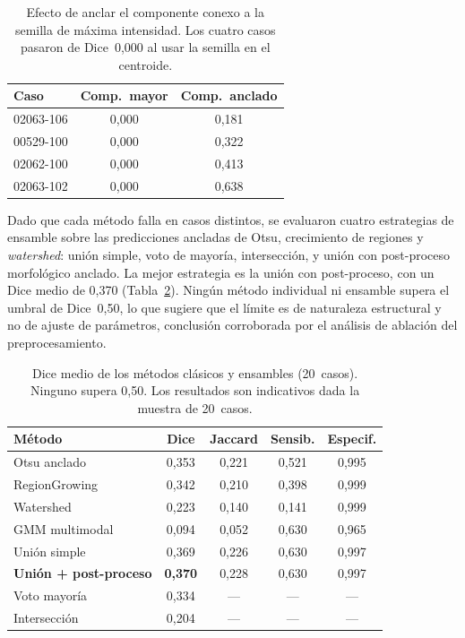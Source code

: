 \documentclass[conference]{IEEEtran}
\begin{document}
\begin{table}[h]
\centering\small
\caption{Efecto de anclar el componente conexo a la semilla de
m\'{a}xima intensidad. Los cuatro casos pasaron de Dice~0,000 al
usar la semilla en el centroide.}
\label{tab:rescate}
\begin{tabular}{lcc}
\toprule
Caso & Comp.\ mayor & Comp.\ anclado \\
\midrule
02063-106 & 0,000 & 0,181 \\
00529-100 & 0,000 & 0,322 \\
02062-100 & 0,000 & 0,413 \\
02063-102 & 0,000 & 0,638 \\
\bottomrule
\end{tabular}
\end{table}

Dado que cada m\'{e}todo falla en casos distintos, se evaluaron
cuatro estrategias de ensamble sobre las predicciones ancladas
de Otsu, crecimiento de regiones y \textit{watershed}: uni\'{o}n
simple, voto de mayor\'{i}a, intersecci\'{o}n, y uni\'{o}n con
post-proceso morfol\'{o}gico anclado.
La mejor estrategia es la uni\'{o}n con post-proceso, con un Dice
medio de 0,370 (Tabla~\ref{tab:clasicos}).
Ning\'{u}n m\'{e}todo individual ni ensamble supera el umbral de
Dice~0,50, lo que sugiere que el l\'{i}mite es de naturaleza
estructural y no de ajuste de par\'{a}metros, conclusi\'{o}n
corroborada por el an\'{a}lisis de ablaci\'{o}n del
preprocesamiento.

\begin{table}[h]
\centering\small
\caption{Dice medio de los m\'{e}todos cl\'{a}sicos y ensambles
(20~casos). Ninguno supera 0,50. Los resultados son indicativos
dada la muestra de 20~casos.}
\label{tab:clasicos}
\begin{tabular}{lcccc}
\toprule
M\'{e}todo & Dice & Jaccard & Sensib. & Especif. \\
\midrule
Otsu anclado & 0,353 & 0,221 & 0,521 & 0,995 \\
RegionGrowing & 0,342 & 0,210 & 0,398 & 0,999 \\
Watershed & 0,223 & 0,140 & 0,141 & 0,999 \\
GMM multimodal & 0,094 & 0,052 & 0,630 & 0,965 \\
\midrule
Uni\'{o}n simple & 0,369 & 0,226 & 0,630 & 0,997 \\
\textbf{Uni\'{o}n + post-proceso} & \textbf{0,370} & 0,228 & 0,630 & 0,997 \\
Voto mayor\'{i}a & 0,334 & --- & --- & --- \\
Intersecci\'{o}n & 0,204 & --- & --- & --- \\
\bottomrule
\end{tabular}
\end{table}
\end{document}
